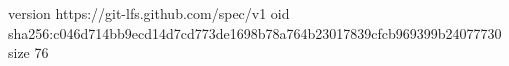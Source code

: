 version https://git-lfs.github.com/spec/v1
oid sha256:c046d714bb9ecd14d7cd773de1698b78a764b23017839cfcb969399b24077730
size 76
